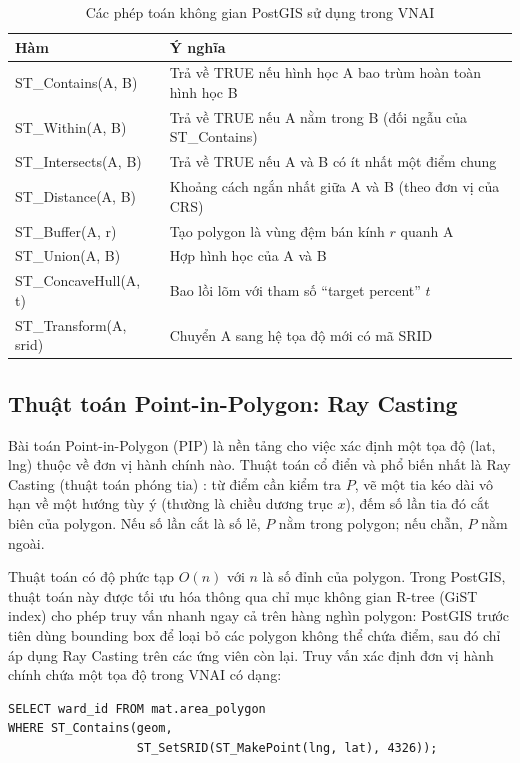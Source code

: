 \begin{table}[h]
\centering
\caption{Các phép toán không gian PostGIS sử dụng trong VNAI}
\label{tab:postgis-functions}
\small
\begin{tabularx}{\linewidth}{>{\ttfamily\raggedright\arraybackslash}p{4cm} >{\raggedright\arraybackslash}X}
\toprule
\textnormal{\textbf{Hàm}} & \textbf{Ý nghĩa} \\
\midrule
ST\_Contains(A, B) & Trả về TRUE nếu hình học A bao trùm hoàn toàn hình học B \\
ST\_Within(A, B)   & Trả về TRUE nếu A nằm trong B (đối ngẫu của ST\_Contains) \\
ST\_Intersects(A, B) & Trả về TRUE nếu A và B có ít nhất một điểm chung \\
ST\_Distance(A, B) & Khoảng cách ngắn nhất giữa A và B (theo đơn vị của CRS) \\
ST\_Buffer(A, r)   & Tạo polygon là vùng đệm bán kính $r$ quanh A \\
ST\_Union(A, B)    & Hợp hình học của A và B \\
ST\_ConcaveHull(A, t) & Bao lồi lõm với tham số ``target percent'' $t$ \\
ST\_Transform(A, srid) & Chuyển A sang hệ tọa độ mới có mã SRID \\
\bottomrule
\end{tabularx}
\end{table}

\subsection{Thuật toán Point-in-Polygon: Ray Casting}

Bài toán Point-in-Polygon (PIP) là nền tảng cho việc xác định một tọa độ (lat, lng) thuộc về đơn vị hành chính nào. Thuật toán cổ điển và phổ biến nhất là Ray Casting (thuật toán phóng tia) \cite{Shamos1976}: từ điểm cần kiểm tra $P$, vẽ một tia kéo dài vô hạn về một hướng tùy ý (thường là chiều dương trục $x$), đếm số lần tia đó cắt biên của polygon. Nếu số lần cắt là số lẻ, $P$ nằm trong polygon; nếu chẵn, $P$ nằm ngoài.

Thuật toán có độ phức tạp $O(n)$ với $n$ là số đỉnh của polygon. Trong PostGIS, thuật toán này được tối ưu hóa thông qua chỉ mục không gian R-tree (GiST index) cho phép truy vấn nhanh ngay cả trên hàng nghìn polygon: PostGIS trước tiên dùng bounding box để loại bỏ các polygon không thể chứa điểm, sau đó chỉ áp dụng Ray Casting trên các ứng viên còn lại. Truy vấn xác định đơn vị hành chính chứa một tọa độ trong VNAI có dạng:
\begin{verbatim}
SELECT ward_id FROM mat.area_polygon
WHERE ST_Contains(geom,
                  ST_SetSRID(ST_MakePoint(lng, lat), 4326));
\end{verbatim}

